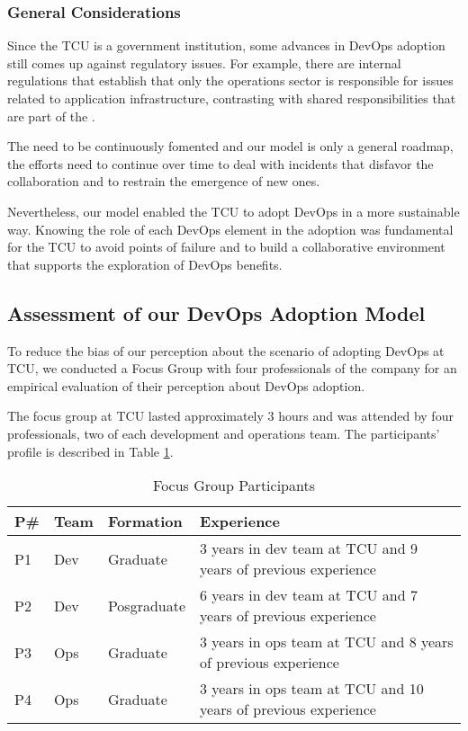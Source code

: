 \subsubsection{General Considerations}
Since the TCU is a government institution, some advances in DevOps adoption
still comes up against regulatory issues. For example, there are internal
regulations that establish that only the operations sector is responsible for
issues related to application infrastructure, contrasting with shared
responsibilities that are part of the \cc.

The \cc need to be continuously fomented and our model is only a general roadmap,
the efforts need to continue over time to deal with incidents that disfavor
the collaboration and to restrain the emergence of new ones.

Nevertheless, our model enabled the TCU to adopt DevOps in a more sustainable
way. Knowing the role of each DevOps element in the adoption was fundamental for
the TCU to avoid points of failure and to build a collaborative environment that
supports the exploration of DevOps benefits.

\subsection{Assessment of our DevOps Adoption Model}

To reduce the bias of our perception about the scenario of adopting DevOps at
TCU, we conducted a Focus Group with four professionals of the company for an
empirical evaluation of their perception about DevOps adoption.

The focus group at TCU lasted approximately 3 hours and was attended by four
professionals, two of each development and operations team. The participants'
profile is described in Table \ref{focusgroup_part}.

\begin{table}[hb!]
\centering
\begin{tabular}{|p{0.6cm}|p{1.2cm}|p{2.5cm}|p{6cm}|} \hline
{\bf P\#} & {\bf Team} & {\bf Formation} & {\bf Experience}\\ \hline
P1 & Dev & Graduate & 3 years in dev team at TCU and 9 years of previous experience \\ \hline
P2 & Dev & Posgraduate & 6 years in dev team at TCU and 7 years of previous experience \\ \hline
P3 & Ops & Graduate & 3 years in ops team at TCU and 8 years of previous experience \\ \hline
P4 & Ops & Graduate & 3 years in ops team at TCU and 10 years of previous experience \\ \hline
\end{tabular}
\caption{Focus Group Participants}
\label{focusgroup_part}
\end{table}

